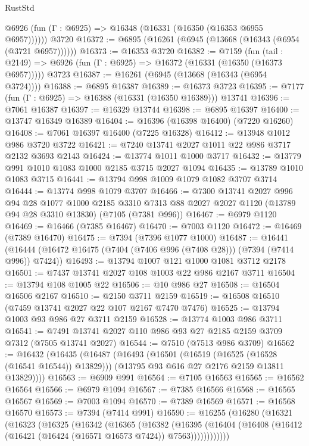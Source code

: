 \begin{lexlean}{RustStd}
\begin{coremodule}
      @6926 (fun (Γ : @6925) => @16348 (@16331 (@16350 (@16353 @6955 @6957))))))
    @3720
@16372 := @6895 (@16261 (@6945 (@13668 (@16343 (@6954 (@3721 @6957))))))
@16373 := @16353 @3720
@16382 := @7159
    (fun (tail : @2149) => @6926 (fun (Γ : @6925) => @16372 (@16331 (@16350 (@16373 @6957)))))
    @3723
@16387 := @16261 (@6945 (@13668 (@16343 (@6954 @3724))))
@16388 := @6895 @16387
@16389 := @16373 @3723
@16395 := @7177 (fun (Γ : @6925) => @16388 (@16331 (@16350 @16389))) @13741
@16396 := @7061 @16387
@16397 := @16329 @13744
@16398 := @6895 @16397
@16400 := @13747 @16349 @16389
@16404 := @16396 (@16398 @16400) (@7220 @16260)
@16408 := @7061 @16397 @16400 (@7225 @16328)
@16412 := @13948 @1012 @986 @3720 @3722
@16421 := @7240 @13741 @2027 @1011 @22 @986 @3717 @2132 @3693 @2143
@16424 := @13774 @1011 @1000 @3717
@16432 := @13779 @991 @1010 @1083 @1000 @2185 @3715 @2027 @1094
@16435 := @13789 @1010 @1083 @3715
@16441 := @13794 @998 @1009 @1079 @1082 @3707 @3714
@16444 := @13774 @998 @1079 @3707
@16466 := @7300
    @13741
    @2027
    @996
    @94
    @28
    @1077
    @1000
    @2185
    @3310
    @7313
    @88
    @2027
    @2027
    @1120
    (@13789 @94 @28 @3310 @13830)
    (@7105 (@7381 @996))
@16467 := @6979 @1120
@16469 := @16466 (@7385 @16467)
@16470 := @7003 @1120
@16472 := @16469 (@7389 @16470)
@16475 := @7394 (@7396 @1077 @1000)
@16487 := @16441
    (@16444 (@16472 @16475 (@7404 (@7406 @996 (@7408 @28))) (@7394 (@7414 @996)) @7424))
@16493 := @13794 @1007 @121 @1000 @1081 @3712 @2178
@16501 := @7437 @13741 @2027 @108 @1003 @22 @986 @2167 @3711
@16504 := @13794 @108 @1005 @22
@16506 := @10 @986 @27
@16508 := @16504 @16506 @2167
@16510 := @2150 @3711 @2159
@16519 := @16508 @16510 (@7459 @13741 @2027 @22 @107 @2167 @7470 @7476)
@16525 := @13794 @1003 @93 @986 @27 @3711 @2159
@16528 := @13774 @1003 @986 @3711
@16541 := @7491 @13741 @2027 @110 @986 @93 @27 @2185 @2159 @3709 @7312 (@7505 @13741 @2027)
@16544 := @7510 (@7513 @986 @3709)
@16562 := @16432
    (@16435
      (@16487
        (@16493
          (@16501 (@16519 (@16525 (@16528 (@16541 @16544)) @13829)))
          (@13795 @93 @616 @27 @2176 @2159 @13811 @13829))))
@16563 := @6909 @991
@16564 := @7105 @16563
@16565 := @16562 @16564
@16566 := @6979 @1094
@16567 := @7385 @16566
@16568 := @16565 @16567
@16569 := @7003 @1094
@16570 := @7389 @16569
@16571 := @16568 @16570
@16573 := @7394 (@7414 @991)
@16590 := @16255
    (@16280
      (@16321
        (@16323
          (@16325
            (@16342
              (@16365
                (@16382
                  (@16395
                    (@16404 (@16408 (@16412 (@16421 (@16424 (@16571 @16573 @7424)) @7563))))))))))))

\end{coremodule}
\end{lexlean}
